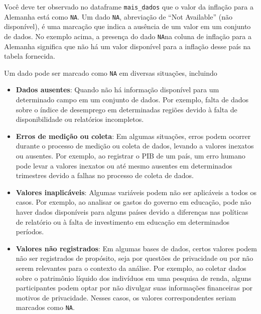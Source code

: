 \documentclass[
  portuguese,
  letterpaper,
  DIV=11,
  numbers=noendperiod]{scrreprt}
\theoremstyle{definition}
\theoremstyle{remark}
\begin{document}
\begin{tcolorbox}[enhanced jigsaw, leftrule=.75mm, opacitybacktitle=0.6, colback=white, coltitle=black, colframe=quarto-callout-important-color-frame, titlerule=0mm, left=2mm, opacityback=0, breakable, bottomtitle=1mm, toprule=.15mm, title=\textcolor{quarto-callout-important-color}{\faExclamation}\hspace{0.5em}{Dados faltantes}, colbacktitle=quarto-callout-important-color!10!white, arc=.35mm, rightrule=.15mm, bottomrule=.15mm, toptitle=1mm]

Você deve ter observado no dataframe \texttt{mais\_dados} que o valor da
inflação para a Alemanha está como \texttt{NA}. Um dado \texttt{NA},
abreviação de ``Not Available'' (não disponível), é uma marcação que
indica a ausência de um valor em um conjunto de dados. No exemplo acima,
a presença do dado \texttt{NA}na coluna de inflação para a Alemanha
significa que não há um valor disponível para a inflação desse país na
tabela fornecida.

Um dado pode ser marcado como \texttt{NA} em diversas situações,
incluindo

\begin{itemize}
\item
  \textbf{Dados ausentes}: Quando não há informação disponível para um
  determinado campo em um conjunto de dados. Por exemplo, falta de dados
  sobre o índice de desemprego em determinadas regiões devido à falta de
  disponibilidade ou relatórios incompletos.
\item
  \textbf{Erros de medição ou coleta}: Em algumas situações, erros podem
  ocorrer durante o processo de medição ou coleta de dados, levando a
  valores inexatos ou ausentes. Por exemplo, ao registrar o PIB de um
  país, um erro humano pode levar a valores inexatos ou até mesmo
  ausentes em determinados trimestres devido a falhas no processo de
  coleta de dados.
\item
  \textbf{Valores inaplicáveis}: Algumas variáveis podem não ser
  aplicáveis a todos os casos. Por exemplo, ao analisar os gastos do
  governo em educação, pode não haver dados disponíveis para alguns
  países devido a diferenças nas políticas de relatório ou à falta de
  investimento em educação em determinados períodos.
\item
  \textbf{Valores não registrados}: Em algumas bases de dados, certos
  valores podem não ser registrados de propósito, seja por questões de
  privacidade ou por não serem relevantes para o contexto da análise.
  Por exemplo, ao coletar dados sobre o patrimônio líquido dos
  indivíduos em uma pesquisa de renda, alguns participantes podem optar
  por não divulgar suas informações financeiras por motivos de
  privacidade. Nesses casos, os valores correspondentes seriam marcados
  como \texttt{NA}.
\end{itemize}

\end{tcolorbox}
\end{document}
